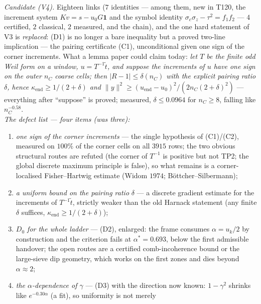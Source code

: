 \documentclass[11pt,a4paper]{article}
\begin{document}
\begin{keybox}
\emph{Candidate (V4).} Eighteen links ($7$ identities --- among them, new in T120, the
increment system $Kv=s-u_0G\mathbf 1$ and the symbol identity
$\sigma_c\sigma_z-\tau^2=f_1f_2$ --- $4$ certified, $2$ classical, $2$ measured, and the
chain), and the one hard statement of V3 is \emph{replaced}: (D1) is no longer a bare
inequality but a proved two-line implication --- the pairing certificate (C1), unconditional
given one sign of the corner increments. What a lemma paper could claim today: \emph{let $T$
be the finite odd Weil form on a window, $u=T^{-1}\tilde t$, and suppose the increments of
$u$ have one sign on the outer $n_C$ coarse cells; then $|R-1|\le\delta(n_C)$ with the
explicit pairing ratio $\delta$, hence $\kappa_{\mathrm{end}}\ge1/(2+\delta)$ and
$\|y\|^2\ge(u_{\mathrm{end}}-u_0)^2/(2n_C(2+\delta)^2)$} --- everything after ``suppose'' is
proved; measured, $\delta\le0.0964$ for $n_C\ge8$, falling like $n_C^{-0.58}$.\\[3pt]
\emph{The defect list --- four items (was three):}
\begin{enumerate}[leftmargin=1.6em]
\item[\textbf{(E1)}] \emph{one sign of the corner increments} --- the single hypothesis of
(C1)/(C2), measured on $100\%$ of the corner cells on all $3915$ rows; the two obvious
structural routes are refuted (the corner of $T^{-1}$ is positive but not TP2; the global
discrete maximum principle is false), so what remains is a corner-localised Fisher--Hartwig
estimate (Widom $1974$; B\"ottcher--Silbermann);
\item[\textbf{(E2)}] \emph{a uniform bound on the pairing ratio} $\delta$ --- a discrete
gradient estimate for the increments of $T^{-1}\tilde t$, strictly weaker than the old
Harnack statement (any finite $\delta$ suffices, $\kappa_{\mathrm{end}}\ge1/(2+\delta)$);
\item[\textbf{(E3)}] \emph{$D_0$ for the whole ladder} --- (D2), enlarged: the frame consumes
$\alpha=u_k/2$ by construction and the criterion fails at $\alpha^*=0.693$, below the first
admissible handover; the open routes are a certified comb-incoherence bound or the
large-sieve dip geometry, which works on the first zones and dies beyond $\alpha\approx2$;
\item[\textbf{(E4)}] \emph{the $\alpha$-dependence of $\gamma$} --- (D3) with the direction
now known: $1-\gamma^2$ shrinks like $e^{-0.30\alpha}$ (a fit), so uniformity is not merely

\end{enumerate}
\end{keybox}
\end{document}
